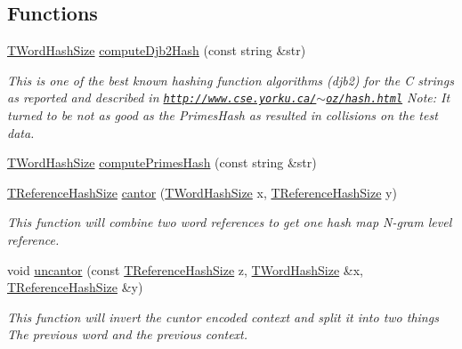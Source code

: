 \subsection*{Functions}
\begin{DoxyCompactItemize}
\item 
\hyperlink{namespacehashing_aa08467967a260f22e9dcf6983aa38c81}{T\+Word\+Hash\+Size} \hyperlink{namespacehashing_a25e4ac309ffbe4b908d1613f4dfcd3a2}{compute\+Djb2\+Hash} (const string \&str)
\begin{DoxyCompactList}\small\item\em This is one of the best known hashing function algorithms (djb2) for the C strings as reported and described in \href{http://www.cse.yorku.ca/~oz/hash.html}{\tt http\+://www.\+cse.\+yorku.\+ca/$\sim$oz/hash.\+html} Note\+: It turned to be not as good as the Primes\+Hash as resulted in collisions on the test data. \end{DoxyCompactList}\item 
\hyperlink{namespacehashing_aa08467967a260f22e9dcf6983aa38c81}{T\+Word\+Hash\+Size} \hyperlink{namespacehashing_ae6401f4d7cf46aff6f9f5171593433ca}{compute\+Primes\+Hash} (const string \&str)
\item 
\hyperlink{namespacehashing_a0c0f51ea23331c249e570f323e48056c}{T\+Reference\+Hash\+Size} \hyperlink{namespacehashing_af05a30bd014cabba826f4ad3c03d68dc}{cantor} (\hyperlink{namespacehashing_aa08467967a260f22e9dcf6983aa38c81}{T\+Word\+Hash\+Size} x, \hyperlink{namespacehashing_a0c0f51ea23331c249e570f323e48056c}{T\+Reference\+Hash\+Size} y)
\begin{DoxyCompactList}\small\item\em This function will combine two word references to get one hash map N-\/gram level reference. \end{DoxyCompactList}\item 
void \hyperlink{namespacehashing_a22b46cd16001aabaa5212b223a028c4d}{uncantor} (const \hyperlink{namespacehashing_a0c0f51ea23331c249e570f323e48056c}{T\+Reference\+Hash\+Size} z, \hyperlink{namespacehashing_aa08467967a260f22e9dcf6983aa38c81}{T\+Word\+Hash\+Size} \&x, \hyperlink{namespacehashing_a0c0f51ea23331c249e570f323e48056c}{T\+Reference\+Hash\+Size} \&y)
\begin{DoxyCompactList}\small\item\em This function will invert the cuntor encoded context and split it into two things The previous word and the previous context. \end{DoxyCompactList}\item 

\end{DoxyCompactItemize}
